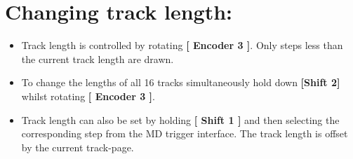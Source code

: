 \section{Changing track length:}
\begin{itemize}
	\item Track length is controlled by rotating \textbf{[ Encoder 3 ]}. Only steps less than the current track length are drawn.
	\item To change the lengths of all 16 tracks simultaneously hold down \textbf{[Shift 2]} whilst rotating \textbf{[ Encoder 3 ]}.
	\item Track length can also be set by holding \textbf{[ Shift 1 ]} and then selecting the corresponding step from the MD trigger interface. The track length is offset by the current track-page.
\end{itemize}

